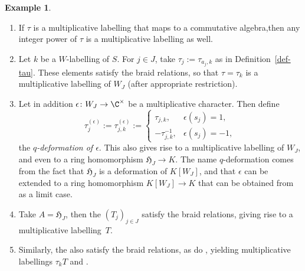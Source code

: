 \documentclass[10pt,a4paper]{amsart}
\theoremstyle{definition}
\newtheorem{Example}[Theorem]{Example}
\numberwithin{equation}{section}
\begin{document}
\begin{Example}\label{sec:ex-labellings}\qquad
\begin{enumerate}\itemsep=0pt
 \item[(i)] If $\tau$ is a multiplicative labelling that maps to a commutative algebra,then
 any integer power of $\tau$ is a multiplicative labelling as well.
 \item[(ii)]
 Let $k$ be a $W$-labelling of $S$. For $j\in J$, take $\tau_j := \tau_{a_j,k}$ as in Definition~\ref{def-tau}. These elements satisfy the braid relations, so that
 $\tau=\tau_k$ is a multiplicative labelling of $W_J$ (after
 appropriate restriction).
 \item[(iii)] Let in addition $\epsilon\colon W_J\to\C^\times$ be a multiplicative character. Then
 define
 \[
 \tau^{(\epsilon)}_j := \tau^{(\epsilon)}_{j,k} :=
 \begin{cases}
 \tau_{j,k}, & \epsilon(s_j)=1,\\
 -\tau_{j,k}^{-1}, & \epsilon(s_j)=-1,
 \end{cases}
 \]
 the \emph{$q$-deformation of $\epsilon$}. This also gives rise to
 a multiplicative labelling  of $W_J$, and even
 to a ring
 homomorphism $\mathfrak{H}_J\to K$.
 The name $q$-deformation comes from the fact that $\mathfrak{H}_J$
 is a deformation of $K[W_J]$, and that $\epsilon$ can be extended to
 a ring homomorphism $K[W_J]\to K$ that can be obtained from~ as a limit case.
 \item[(iv)] Take $A=\mathfrak{H}_J$, then the $(T_j)_{j\in J}$ satisfy the braid
 relations, giving rise to a multiplicative labelling~$T$.
 \item[(v)] Similarly, the  also satisfy the braid
 relations, as do , yielding multiplicative labellings $\tau_k T$ and .
\end{enumerate}
\end{Example}
\end{document}
